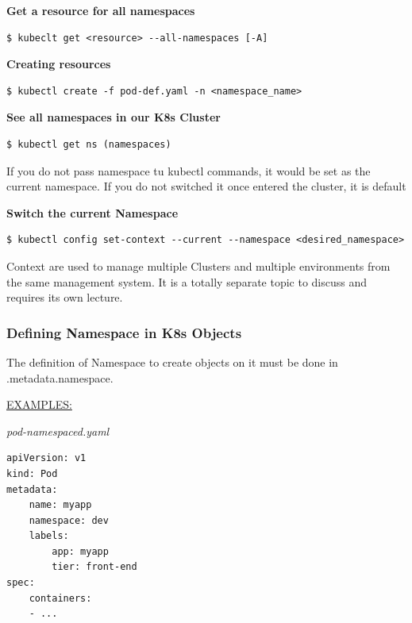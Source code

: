 \documentclass{article}
\newenvironment{blocktemplateI}[1]{%
    \tcolorbox[beamer,%
    noparskip,breakable,
    colframe=Violet,%
    colbacklower=Black,%
    title=#1]}%
    {\endtcolorbox}
\newenvironment{blocktemplateIII}[1]{%
    \tcolorbox[beamer,%
    noparskip,breakable,
    ,colframe=Red,%
    colbacklower=LimeGreen!75!LightGreen,%
    title=#1]}%
    {\endtcolorbox}
\newenvironment{codetemplate}[1][]{%
  \mybasecolorbox[#1]
  \itshape
}{%
  \endmybasecolorbox
}
\begin{document}
\textbf{Get a resource for all namespaces}
\begin{codetemplate}{}
\begin{verbatim}
$ kubeclt get <resource> --all-namespaces [-A]
\end{verbatim}
\end{codetemplate}

\textbf{Creating resources}
\begin{codetemplate}{}
\begin{verbatim}
$ kubectl create -f pod-def.yaml -n <namespace_name>
\end{verbatim}
\end{codetemplate}

\textbf{See all namespaces in our K8s Cluster}
\begin{codetemplate}{}
\begin{verbatim}
$ kubectl get ns (namespaces)
\end{verbatim}
\end{codetemplate}

\begin{blocktemplateIII}{WARNING}
If you do not pass namespace tu kubectl commands, it would be set as the current namespace. If you do not switched it once entered the cluster, it is default
\end{blocktemplateIII}

\textbf{Switch the current Namespace}
\begin{codetemplate}{}
\begin{verbatim}
$ kubectl config set-context --current --namespace <desired_namespace>
\end{verbatim}
\end{codetemplate}

\begin{blocktemplateI}{NOTE}
Context are used to manage multiple Clusters and multiple environments from the same management system. It is a totally separate topic to discuss and requires its own lecture.
\end{blocktemplateI}

\subsubsection{Defining Namespace in K8s Objects}

The definition of Namespace to create objects on it must be done in .metadata.namespace.

\underline{EXAMPLES:}

\begin{codetemplate}{pod-namespaced.yaml}
\begin{verbatim}
apiVersion: v1
kind: Pod
metadata:
    name: myapp
    namespace: dev
    labels:
        app: myapp
        tier: front-end
spec:
    containers:
    - ...
\end{verbatim}
\end{codetemplate}
\end{document}

